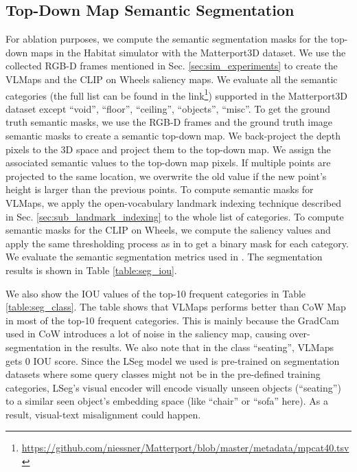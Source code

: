 \documentclass[letterpaper, 10 pt, conference]{ieeeconf}  %
\begin{document}
\subsection{Top-Down Map Semantic Segmentation}\label{sec:top_down_semantic}
For ablation purposes, we compute the semantic segmentation masks for the top-down maps in the Habitat simulator with the Matterport3D dataset. We use the collected RGB-D frames mentioned in Sec. \ref{sec:sim_experiments} to create the VLMaps and the CLIP on Wheels saliency maps. We evaluate all the semantic categories (the full list can be found in the link\footnote{\href{https://github.com/niessner/Matterport/blob/master/metadata/mpcat40.tsv}{https://github.com/niessner/Matterport/blob/master/metadata/mpcat40.tsv}}) supported in the Matterport3D dataset except ``void'', ``floor'', ``ceiling'', ``objects'', ``misc''. To get the ground truth semantic masks, we use the RGB-D frames and the ground truth image semantic masks to create a semantic top-down map. We back-project the depth pixels to the 3D space and project them to the top-down map. We assign the associated semantic values to the top-down map pixels. If multiple points are projected to the same location, we overwrite the old value if the new point's height is larger than the previous points. To compute semantic masks for VLMaps, we apply the open-vocabulary landmark indexing technique described in Sec. \ref{sec:sub_landmark_indexing} to the whole list of categories. To compute semantic masks for the CLIP on Wheels, we compute the saliency values and apply the same thresholding process as in \cite{gadre2022clip} to get a binary mask for each category. We evaluate the semantic segmentation metrics used in \cite{long2015fully}. The segmentation results is shown in Table \ref{table:seg_iou}.

We also show the IOU values of the top-10 frequent categories in Table \ref{table:seg_class}. The table shows that VLMaps performs better than CoW Map in most of the top-10 frequent categories. This is mainly because the GradCam used in CoW introduces a lot of noise in the saliency map, causing over-segmentation in the results. We also note that in the class ``seating'', VLMaps gets 0 IOU score. Since the LSeg model we used is pre-trained on segmentation datasets where some query classes might not be in the pre-defined training categories, LSeg's visual encoder will encode visually unseen objects (``seating'') to a similar seen object's embedding space (like ``chair'' or ``sofa'' here). As a result, visual-text misalignment could happen.
\end{document}
